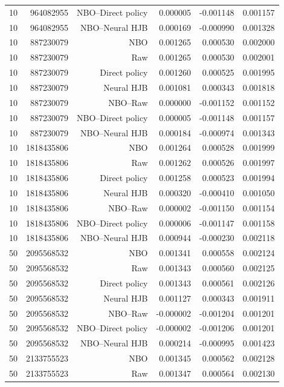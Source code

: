 \begin{longtable}{lrrrrr}
10 & 964082955 & NBO--Direct policy & 0.000005 & -0.001148 & 0.001157 \\
10 & 964082955 & NBO--Neural HJB & 0.000169 & -0.000990 & 0.001328 \\
10 & 887230079 & NBO & 0.001265 & 0.000530 & 0.002000 \\
10 & 887230079 & Raw & 0.001265 & 0.000530 & 0.002001 \\
10 & 887230079 & Direct policy & 0.001260 & 0.000525 & 0.001995 \\
10 & 887230079 & Neural HJB & 0.001081 & 0.000343 & 0.001818 \\
10 & 887230079 & NBO--Raw & 0.000000 & -0.001152 & 0.001152 \\
10 & 887230079 & NBO--Direct policy & 0.000005 & -0.001148 & 0.001157 \\
10 & 887230079 & NBO--Neural HJB & 0.000184 & -0.000974 & 0.001343 \\
10 & 1818435806 & NBO & 0.001264 & 0.000528 & 0.001999 \\
10 & 1818435806 & Raw & 0.001262 & 0.000526 & 0.001997 \\
10 & 1818435806 & Direct policy & 0.001258 & 0.000523 & 0.001994 \\
10 & 1818435806 & Neural HJB & 0.000320 & -0.000410 & 0.001050 \\
10 & 1818435806 & NBO--Raw & 0.000002 & -0.001150 & 0.001154 \\
10 & 1818435806 & NBO--Direct policy & 0.000006 & -0.001147 & 0.001158 \\
10 & 1818435806 & NBO--Neural HJB & 0.000944 & -0.000230 & 0.002118 \\
50 & 2095568532 & NBO & 0.001341 & 0.000558 & 0.002124 \\
50 & 2095568532 & Raw & 0.001343 & 0.000560 & 0.002125 \\
50 & 2095568532 & Direct policy & 0.001343 & 0.000561 & 0.002126 \\
50 & 2095568532 & Neural HJB & 0.001127 & 0.000343 & 0.001911 \\
50 & 2095568532 & NBO--Raw & -0.000002 & -0.001204 & 0.001201 \\
50 & 2095568532 & NBO--Direct policy & -0.000002 & -0.001206 & 0.001201 \\
50 & 2095568532 & NBO--Neural HJB & 0.000214 & -0.000995 & 0.001423 \\
50 & 2133755523 & NBO & 0.001345 & 0.000562 & 0.002128 \\
50 & 2133755523 & Raw & 0.001347 & 0.000564 & 0.002130 \\

\end{longtable}
